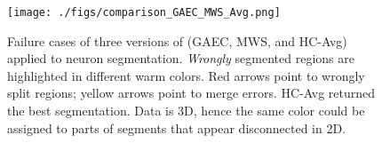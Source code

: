 





\begin{figure}
\centering
\texttt{[image: ./figs/comparison\_GAEC\_MWS\_Avg.png]} %
\caption{Failure cases of three versions of \algname{} (GAEC, MWS, and HC-Avg) applied to neuron segmentation. \emph{Wrongly} segmented regions are highlighted in different warm colors. Red arrows point to wrongly split regions; yellow arrows point to merge errors. HC-Avg returned the best segmentation. Data is 3D, hence the same color could be assigned to parts of segments that appear disconnected in 2D.  
\label{fig:failure_cases}}
\end{figure}








